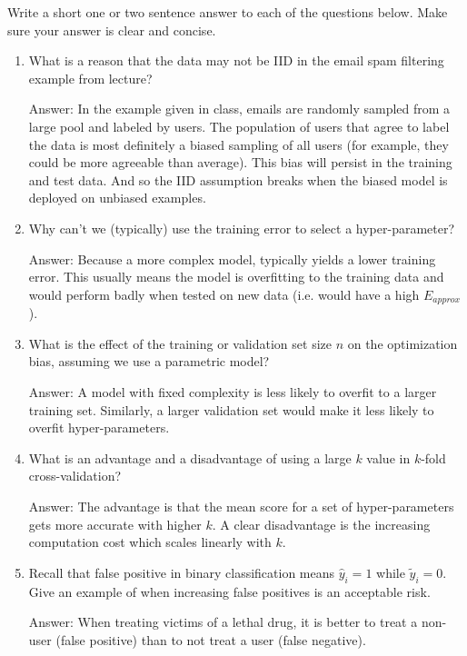 \documentclass{article}
\newcommand{\blu}[1]{{\textcolor{blu}{#1}}}
\newenvironment{answer}{\par\begingroup\color{gre}Answer: }{\endgroup}
\let\ask\blu
\begin{document}
    \ask{Write a short one or two sentence answer to each of the questions below}. Make sure your answer is clear and concise.

    \begin{enumerate}
        \item What is a reason that the data may not be IID in the email spam filtering example from lecture?
        \begin{answer}
            In the example given in class, emails are randomly sampled from a large pool and labeled by users. The population of users that agree to label the data is most definitely a biased sampling of all users (for example, they could be more agreeable than average). This bias will persist in the training and test data. And so the IID assumption breaks when the biased model is deployed on unbiased examples.
        \end{answer}

        \item Why can't we (typically) use the training error to select a hyper-parameter?
        \begin{answer}
            Because a more complex model, typically yields a lower training error. This usually means the model is overfitting to the training data and would perform badly when tested on new data (i.e. would have a high $E_{approx}$).
        \end{answer}

        \item What is the effect of the training or validation set size $n$ on the optimization bias, assuming we use a parametric model?
        \begin{answer}
            A model with fixed complexity is less likely to overfit to a larger training set. Similarly, a larger validation set would make it less likely to overfit hyper-parameters.
        \end{answer}

        \item What is an advantage and a disadvantage of using a large $k$ value in $k$-fold cross-validation?
        \begin{answer}
            The advantage is that the mean score for a set of hyper-parameters gets more accurate with higher $k$. A clear disadvantage is the increasing computation cost which scales linearly with $k$.
        \end{answer}

        \item Recall that false positive in binary classification means $\hat y_i=1$ while $\tilde y_i = 0$. Give an example of when increasing false positives is an acceptable risk.
        \begin{answer}
            When treating victims of a lethal drug, it is better to treat a non-user (false positive) than to not treat a user (false negative).
        \end{answer}


\end{enumerate}
\end{document}
